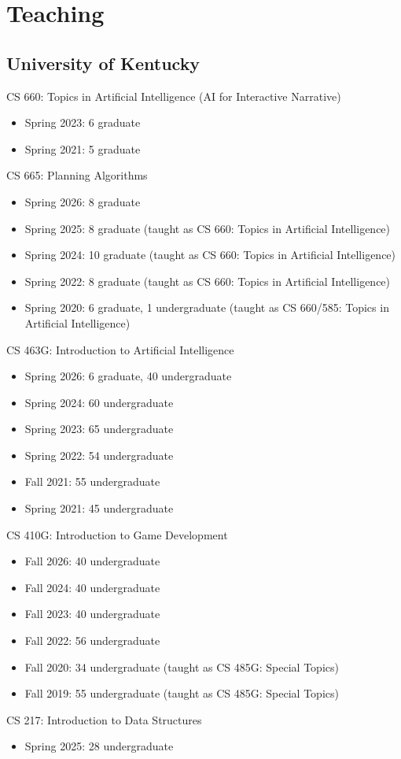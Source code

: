 \documentclass{cv}
\begin{document}

\section*{Teaching}

\subsection*{University of Kentucky}

CS 660: Topics in Artificial Intelligence (AI for Interactive Narrative)
\begin{itemize}
	\item Spring 2023: 6 graduate
	\item Spring 2021: 5 graduate
\end{itemize}
CS 665: Planning Algorithms
\begin{itemize}
	\item Spring 2026: 8 graduate
	\item Spring 2025: 8 graduate (taught as CS 660: Topics in Artificial Intelligence)
	\item Spring 2024: 10 graduate (taught as CS 660: Topics in Artificial Intelligence)
	\item Spring 2022: 8 graduate (taught as CS 660: Topics in Artificial Intelligence)
	\item Spring 2020: 6 graduate, 1 undergraduate (taught as CS 660/585: Topics in Artificial Intelligence)
\end{itemize}
CS 463G: Introduction to Artificial Intelligence
\begin{itemize}
	\item Spring 2026: 6 graduate, 40 undergraduate
	\item Spring 2024: 60 undergraduate
	\item Spring 2023: 65 undergraduate
	\item Spring 2022: 54 undergraduate
	\item Fall 2021: 55 undergraduate
	\item Spring 2021: 45 undergraduate
\end{itemize}
CS 410G: Introduction to Game Development
\begin{itemize}
	\item Fall 2026: 40 undergraduate
	\item Fall 2024: 40 undergraduate
	\item Fall 2023: 40 undergraduate
	\item Fall 2022: 56 undergraduate
	\item Fall 2020: 34 undergraduate (taught as CS 485G: Special Topics)
	\item Fall 2019: 55 undergraduate (taught as CS 485G: Special Topics)
\end{itemize}
CS 217: Introduction to Data Structures
\begin{itemize}
	\item Spring 2025: 28 undergraduate
\end{itemize}
\end{document}
